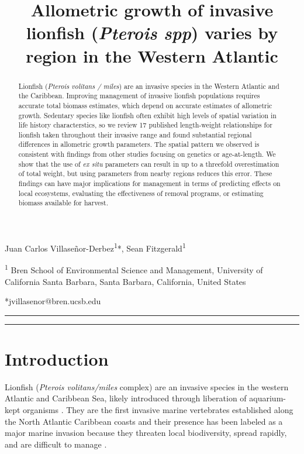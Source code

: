 \documentclass[]{article}
\title{\LARGE{Allometric growth of invasive lionfish (\textit{Pterois spp}) varies by region in the Western Atlantic}}
\author{}
\date{}
\theoremstyle{definition}
\theoremstyle{definition}
\theoremstyle{definition}
\theoremstyle{remark}
\begin{document}
\maketitle

Juan Carlos Villaseñor-Derbez\textsuperscript{1}*, Sean
Fitzgerald\textsuperscript{1}

\textsuperscript{1} Bren School of Environmental Science and Management,
University of California Santa Barbara, Santa Barbara, California,
United States

*jvillasenor@bren.ucsb.edu

\begin{center}\rule{0.5\linewidth}{\linethickness}\end{center}

\begin{abstract}
Lionfish (\textit{Pterois volitans / miles}) are an invasive species in the Western Atlantic and the Caribbean. Improving management of invasive lionfish populations requires accurate total biomass estimates, which depend on accurate estimates of allometric growth. Sedentary species like lionfish often exhibit high levels of spatial variation in life history characterstics, so we review 17 published length-weight relationships for lionfish taken throughout their invasive range and found substantial regional differences in allometric growth parameters. The spatial pattern we observed is consistent with findings from other studies focusing on genetics or age-at-length. We show that the use of \textit{ex situ} parameters can result in up to a threefold overestimation of total weight, but using parameters from nearby regions reduces this error. These findings can have major implications for management in terms of predicting effects on local ecosystems, evaluating the effectiveness of removal programs, or estimating biomass available for harvest.
\end{abstract}

\begin{center}\rule{0.5\linewidth}{\linethickness}\end{center}

\section{Introduction}\label{introduction}

Lionfish (\emph{Pterois volitans/miles} complex) are an invasive species
in the western Atlantic and Caribbean Sea, likely introduced through
liberation of aquarium-kept organisms \citep{betancurr_2011}. They are
the first invasive marine vertebrates established along the North
Atlantic Caribbean coasts
\citep{schofield_2009,schofield_2010,sabidoitza_2016} and their presence
has been labeled as a major marine invasion because they threaten local
biodiversity, spread rapidly, and are difficult to manage
\citep{hixon_2016}.
\end{document}
